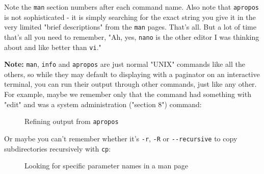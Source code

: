 \documentclass[10pt,american,]{book}
\makeatletter
\newenvironment{Shaded}{\begin{snugshade}}{\end{snugshade}}
\newcommand{\KeywordTok}[1]{\textcolor[rgb]{0.13,0.29,0.53}{\textbf{{#1}}}}
\newcommand{\StringTok}[1]{\textcolor[rgb]{0.31,0.60,0.02}{{#1}}}
\newcommand{\NormalTok}[1]{{#1}}
\numberwithin{figure}{chapter}
\DeclareRobustCommand{\drcap}[1]{\begin{figure}[H]\caption{#1}\end{figure}}
\DeclareRobustCommand{\drcmd}[1]{\index{Commands!#1@\texttt{#1}}}
\renewcommand{\KeywordTok}[1]{{#1}}
\renewcommand{\StringTok}[1]{{#1}}
\renewcommand{\NormalTok}[1]{{#1}}
\makeatother
\begin{document}
Note the \texttt{man} section numbers after each command name. Also note
that \texttt{apropos} is not sophisticated - it is simply searching for
the exact string you give it in the very limited "brief descriptions"
from the \texttt{man} pages. That's all. But a lot of time that's all
you need to remember, "Ah, yes, \texttt{nano} is the other editor I was
thinking about and like better than \texttt{vi}."

\textbf{Note:} \texttt{man}, \texttt{info} and \texttt{apropos} are just
normal "UNIX" commands like all the others, so while they may default to
displaying with a paginator on an interactive terminal, you can run
their output through other commands, just like any other. For example,
maybe we remember only that the command had something with "edit" and
was a system administration ("section 8") command:

\drcap{Refining output from \texttt{apropos}}

\begin{Shaded}
\end{Shaded}

Or maybe you can't remember whether it's \texttt{-r}, \texttt{-R} or
\texttt{-\/-recursive} to copy subdirectories recursively with
\texttt{cp}\drcmd{cp}:

\drcap{Looking for specific parameter names in a man page}

\begin{Shaded}
\end{Shaded}
\end{document}
